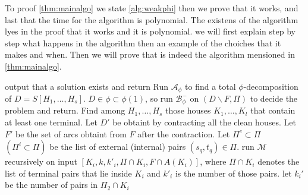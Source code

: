 To proof \autoref{thm:mainalgo} we state \autoref{alg:weakphi} then we prove that it works, and last that the time for the algorithm is polynomial. 
The existens of the algorithm lyes in the proof that it works and it is polynomial. we will first explain step by step what happens in the algorithm then an example of the choiches that it makes and when. Then we will prove that is indeed the algorithm mensioned in \autoref{thm:mainalgo}.
\begin{algorithm}   
    \begin{algorithmic}[1]
        \IF{$\Pi=\emptyset$}
            \STATE output that a solution exists and return
        \ENDIF
        \STATE Run $\mathcal{A}_{\phi}$ to find a total $\phi$-decomposition of $D=S[H_1,\dots,H_s]$.
            \STATE $D\in \phi\subset \phi(1)$, so run $\mathcal{B}^-_{\phi}$ on $(D\backslash F,\Pi)$ to decide the problem and return.
        \ENDIF
        \STATE Find among $H_1,\dots, H_s$ those houses $K_1,\dots , K_l$ that contain at least one terminal. 
        Let $D'$ be obtaint by contracting all the clean houses. 
        Let $F'$ be the set of arcs obtaint from $F$ after the contraction.
        \STATE Let $\Pi^e\subset \Pi$ $(\Pi^i\subset \Pi)$ be the list of external (internal) pairs $(s_q,t_q)\in \Pi$.
             \label{state:6a}
                \STATE run $\mathcal{M}$ recursively on input $[K_i, k, k'_i,\Pi \cap K_i, F\cap A(K_i)]$, where $\Pi \cap K_i$ denotes the list of terminal pairs that lie inside $K_i$ and $k'_i$ is the number of those pairs.
            \ENDIF
             \label{state:6b}
                \STATE let $k_i'$ be the number of pairs in $\Pi _2\cap K_i$
\end{algorithmic}
\end{algorithm}
